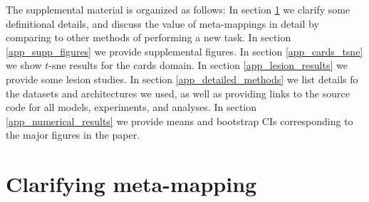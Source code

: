 \appendix
The supplemental material is organized as follows: In section \ref{app_clarifying_meta_mapping} we clarify some definitional details, and discuss the value of meta-mappings in detail by comparing to other methods of performing a new task. In section \ref{app_supp_figures} we provide supplemental figures. In section \ref{app_cards_tsne} we show $t$-sne results for the cards domain. In section \ref{app_lesion_results} we provide some lesion studies. In section \ref{app_detailed_methods} we list details fo the datasets and architectures we used, as well as providing links to the source code for all models, experiments, and analyses. In section \ref{app_numerical_results} we provide means and bootstrap CIs corresponding to the major figures in the paper. \par  

\section{Clarifying meta-mapping} \label{app_clarifying_meta_mapping}
